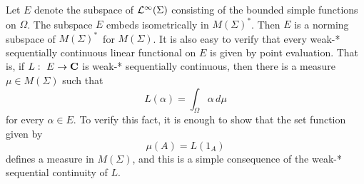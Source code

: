 Let $E$ denote the subspace of ${\cal L}^\infty(\Sigma)$ 
consisting of the bounded simple functions on $\Omega$.  
The subspace $E$ embeds isometrically in $M(\Sigma)^*$.  
Then $E$ is a norming subspace of $M(\Sigma)^*$\ for $M(\Sigma)$.
It is also easy to verify that every weak-* sequentially 
continuous linear functional on $E$ is given by point 
evaluation.  That is, if $L:\ E\rightarrow \C$ is 
weak-* sequentially continuous, then there is a 
measure $\mu\in M(\Sigma)$ such that 
\begin{equation}
L(\alpha)=\int_\Omega \alpha \,d\mu
\label{lofe}
\end{equation}
for every $\alpha\in E$.  To verify this fact, it is enough to 
show that the set function given by
\begin{equation}
\mu(A)=L(1_A)
\label{mua}
\end{equation}
defines a measure in $M(\Sigma)$, and this is 
a simple consequence of the
weak-* sequential continuity of $L$.
  

